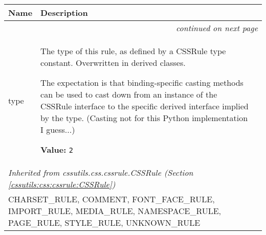    \vspace{-1cm}
\hspace{\varindent}\begin{longtable}{|p{\varnamewidth}|p{\vardescrwidth}|l}
\cline{1-2}
\cline{1-2} \centering \textbf{Name} & \centering \textbf{Description}& \\
\cline{1-2}
\endhead\cline{1-2}\multicolumn{3}{r}{\small\textit{continued on next page}}\\\endfoot\cline{1-2}
\endlastfoot\raggedright t\-y\-p\-e\- & \raggedright The type of this rule, as defined by a CSSRule type constant.
Overwritten in derived classes.

The expectation is that binding-specific casting methods can be used to
cast down from an instance of the CSSRule interface to the specific
derived interface implied by the type.
(Casting not for this Python implementation I guess...)

\textbf{Value:} 
{\tt 2}&\\
\cline{1-2}
\multicolumn{2}{|l|}{\textit{Inherited from cssutils.css.cssrule.CSSRule \textit{(Section \ref{cssutils:css:cssrule:CSSRule})}}}\\
\multicolumn{2}{|p{\varwidth}|}{\raggedright CHARSET\_RULE, COMMENT, FONT\_FACE\_RULE, IMPORT\_RULE, MEDIA\_RULE, NAMESPACE\_RULE, PAGE\_RULE, STYLE\_RULE, UNKNOWN\_RULE}\\
\cline{1-2}
\end{longtable}

